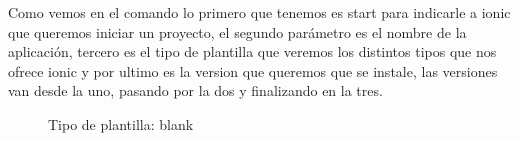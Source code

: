 \documentclass[a4paper, 11pt]{article}
\begin{document}
\begin{itemize}
            Como vemos en el comando lo primero que tenemos es start para indicarle
            a ionic que queremos iniciar un proyecto, el segundo parámetro es el
            nombre de la aplicación, tercero es el tipo de plantilla que veremos los
            distintos tipos que nos ofrece ionic y por ultimo es la version que
            queremos que se instale, las versiones van desde la uno, pasando por la
            dos y finalizando en la tres.


                   \begin{figure}[H]
                     \centering
                      \caption{Tipo de plantilla: blank}
                      \label{f:blank}
                    \end{figure}



\end{itemize}
\end{document}
